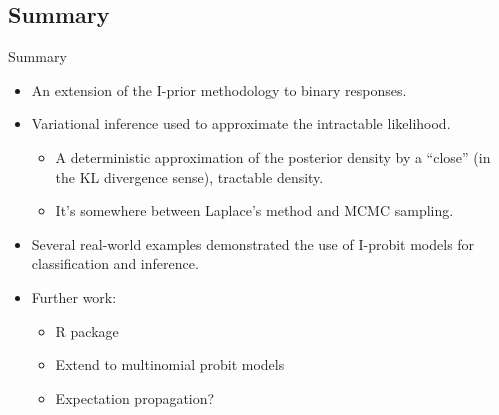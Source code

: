 \subsection{Summary}
\begin{frame}{Summary}
  \begin{itemize}\setlength\itemsep{0.8em}
    \item An extension of the I-prior methodology to binary responses.
    \item Variational inference used to approximate the intractable likelihood.
    \begin{itemize}
      \item A deterministic approximation of the posterior density by a ``close'' (in the KL divergence sense), tractable density.
      \item It's somewhere between Laplace's method and MCMC sampling.
    \end{itemize}
    \item Several real-world examples demonstrated the use of I-probit models for classification and inference.
    \item Further work:
    \begin{itemize}
      \item R package 
      \item Extend to multinomial probit models
      \item Expectation propagation?
    \end{itemize}
  \end{itemize}
\end{frame}
